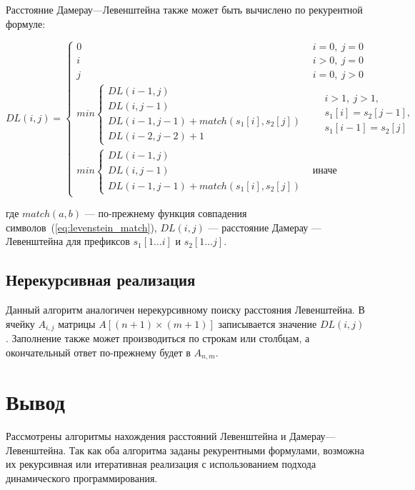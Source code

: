 Расстояние Дамерау---Левенштейна также может быть вычислено по рекурентной формуле:

\begin{equation}
	\label{eq:damerau_levenstein}
	DL(i, j) = 
	\begin{cases}
		0 & i=0,~j=0\\
		i &i > 0,~j = 0\\
		j &i = 0,~j > 0\\
		min\begin{cases}
			DL(i-1, j)\\
			DL(i, j-1)\\
			DL(i-1, j-1) + match(s_1[i], s_2[j])\\
			DL(i-2, j-2) + 1
		\end{cases} & \begin{aligned}
			&i > 1,~j > 1,\\
			&s_1[i] = s_2[j - 1],\\
			&s_1[i - 1] = s_2[j]
		\end{aligned}\\
		min\begin{cases}
			DL(i-1, j)\\
			DL(i, j-1)\\
			DL(i-1, j-1) + match(s_1[i], s_2[j])
		\end{cases} & \text{иначе}
	\end{cases}
\end{equation}

где $match(a, b)$ --- по-прежнему функция совпадения символов~(\ref{eq:levenstein_match}), $DL(i, j)$ --- расстояние Дамерау --- Левенштейна для префиксов $s_1[1\ldots i]$ и $s_2[1\ldots j]$.

\subsection{Нерекурсивная реализация}

Данный алгоритм аналогичен нерекурсивному поиску расстояния Левенштейна. В ячейку $A_{i, j}$ матрицы $A[(n + 1) \times (m + 1)]$ записывается значение $DL(i, j)$. Заполнение также может производиться по строкам или столбцам, а окончательный ответ по-прежнему будет в $A_{n, m}$.

\section*{Вывод}

Рассмотрены алгоритмы нахождения расстояний Левенштейна и Дамерау---Левенштейна. Так как оба алгоритма заданы рекурентными формулами, возможна их рекурсивная или итеративная реализация с использованием подхода динамического программирования.

\clearpage